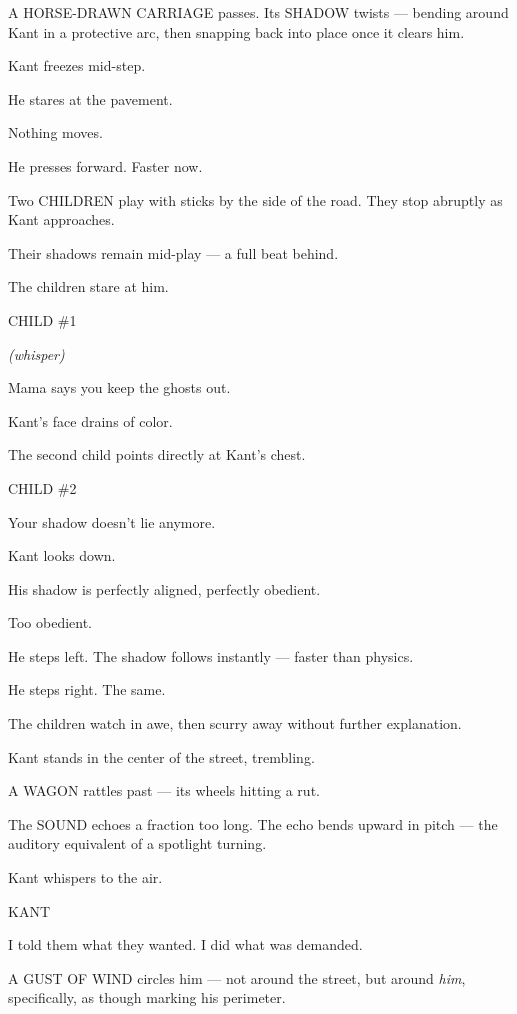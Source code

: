 \documentclass[12pt]{article}
\newenvironment{dialogue}[1]{%
  \vspace{0.8\baselineskip}%
  \noindent\hspace*{2.3in}\textsc{#1}\par%
  \noindent\hspace*{1.5in}\begin{minipage}[t]{4.5in}%
}{%
  \end{minipage}\par%
}
\newcommand{\paren}[1]{%
  \noindent\hspace*{1.8in}\textit{(#1)}\par%
}
\begin{document}
A HORSE-DRAWN CARRIAGE passes.  
Its SHADOW twists —  
bending around Kant in a protective arc,  
then snapping back into place once it clears him.

Kant freezes mid-step.

He stares at the pavement.

Nothing moves.

He presses forward. Faster now.

Two CHILDREN play with sticks by the side of the road.  
They stop abruptly as Kant approaches.

Their shadows remain mid-play —  
a full beat behind.

The children stare at him.

\begin{dialogue}{CHILD \#1}
\paren{whisper}
Mama says you keep the ghosts out.
\end{dialogue}

Kant’s face drains of color.

The second child points directly at Kant’s chest.

\begin{dialogue}{CHILD \#2}
Your shadow doesn’t lie anymore.
\end{dialogue}

Kant looks down.

His shadow is perfectly aligned, perfectly obedient.

Too obedient.

He steps left.  
The shadow follows instantly — faster than physics.

He steps right.  
The same.

The children watch in awe, then scurry away without further explanation.

Kant stands in the center of the street, trembling.

A WAGON rattles past — its wheels hitting a rut.

The SOUND echoes a fraction too long.  
The echo bends upward in pitch —  
the auditory equivalent of a spotlight turning.

Kant whispers to the air.

\begin{dialogue}{KANT}
I told them what they wanted.  
I did what was demanded.
\end{dialogue}

A GUST OF WIND circles him —  
not around the street, but around \emph{him}, specifically,  
as though marking his perimeter.
\end{document}
